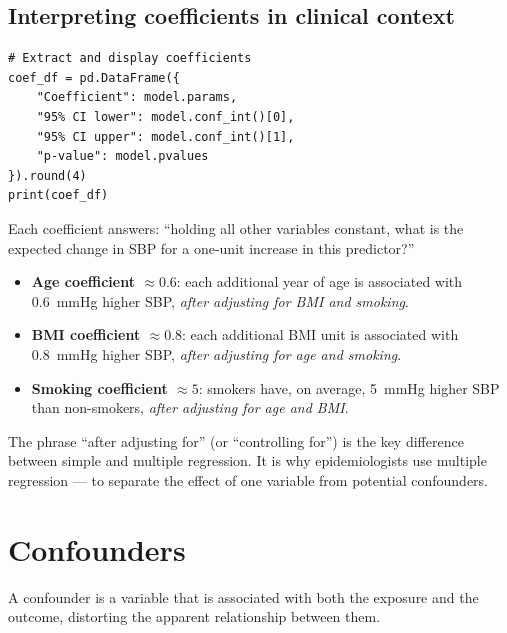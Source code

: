 \subsection{Interpreting coefficients in clinical context}

\begin{verbatim}
# Extract and display coefficients
coef_df = pd.DataFrame({
    "Coefficient": model.params,
    "95% CI lower": model.conf_int()[0],
    "95% CI upper": model.conf_int()[1],
    "p-value": model.pvalues
}).round(4)
print(coef_df)
\end{verbatim}

Each coefficient answers: ``holding all other variables constant, what is the expected change in SBP for a one-unit increase in this predictor?''

\begin{itemize}
  \item \textbf{Age coefficient $\approx 0.6$}: each additional year of age is associated with 0.6~mmHg higher SBP, \emph{after adjusting for BMI and smoking}.
  \item \textbf{BMI coefficient $\approx 0.8$}: each additional BMI unit is associated with 0.8~mmHg higher SBP, \emph{after adjusting for age and smoking}.
  \item \textbf{Smoking coefficient $\approx 5$}: smokers have, on average, 5~mmHg higher SBP than non-smokers, \emph{after adjusting for age and BMI}.
\end{itemize}

\begin{pythontip}
The phrase ``after adjusting for'' (or ``controlling for'') is the key difference between simple and multiple regression. It is why epidemiologists use multiple regression --- to separate the effect of one variable from potential confounders.
\end{pythontip}

\section{Confounders}

A confounder is a variable that is associated with both the exposure and the outcome, distorting the apparent relationship between them.

